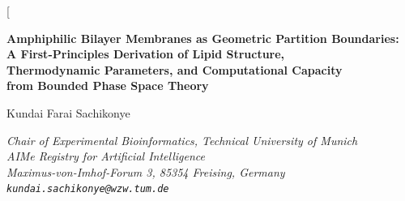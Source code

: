\documentclass[11pt,twocolumn,a4paper]{article}
\theoremstyle{definition}
\theoremstyle{remark}
\begin{document}
\twocolumn[
\begin{@twocolumnfalse}
\begin{center}

{\LARGE\bfseries Amphiphilic Bilayer Membranes as Geometric Partition Boundaries:\\[4pt]
A First-Principles Derivation of Lipid Structure,\\[4pt]
Thermodynamic Parameters, and Computational Capacity\\[4pt]
from Bounded Phase Space Theory}

\vspace{12pt}

{\large Kundai Farai Sachikonye}

\vspace{6pt}

{\small\itshape Chair of Experimental Bioinformatics, Technical University of Munich \\[0.3em]
\small\itshape AIMe Registry for Artificial Intelligence \\[0.2em]
\small\itshape Maximus-von-Imhof-Forum 3, 85354 Freising, Germany \\[0.2em]
\texttt{kundai.sachikonye@wzw.tum.de}}

\vspace{6pt}{\small May 2026}

\vspace{16pt}


\end{center}
\end{@twocolumnfalse}
\end{document}

